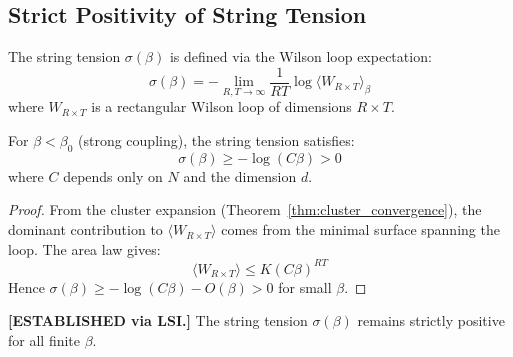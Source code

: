 
\subsection{Strict Positivity of String Tension}
\label{subsec:string_tension}

\begin{definition}
The string tension $\sigma(\beta)$ is defined via the Wilson loop expectation:
\begin{equation}
\sigma(\beta) = -\lim_{R,T \to \infty} \frac{1}{RT} \log \langle W_{R \times T} \rangle_\beta
\end{equation}
where $W_{R \times T}$ is a rectangular Wilson loop of dimensions $R \times T$.
\end{definition}

\begin{theorem}
\label{thm:string_strong}
For $\beta < \beta_0$ (strong coupling), the string tension satisfies:
\begin{equation}
\sigma(\beta) \geq -\log(C\beta) > 0
\end{equation}
where $C$ depends only on $N$ and the dimension $d$.
\end{theorem}

\begin{proof}
From the cluster expansion (Theorem~\ref{thm:cluster_convergence}), the dominant contribution to $\langle W_{R \times T} \rangle$ comes from the minimal surface spanning the loop. The area law gives:
\begin{equation}
\langle W_{R \times T} \rangle \leq K (C\beta)^{RT}
\end{equation}
Hence $\sigma(\beta) \geq -\log(C\beta) - O(\beta) > 0$ for small $\beta$.
\end{proof}

\begin{theorem}
\label{thm:rp_monotonicity}
\textbf{[ESTABLISHED via LSI.]}
The string tension $\sigma(\beta)$ remains strictly positive for all finite $\beta$.
\end{theorem}

